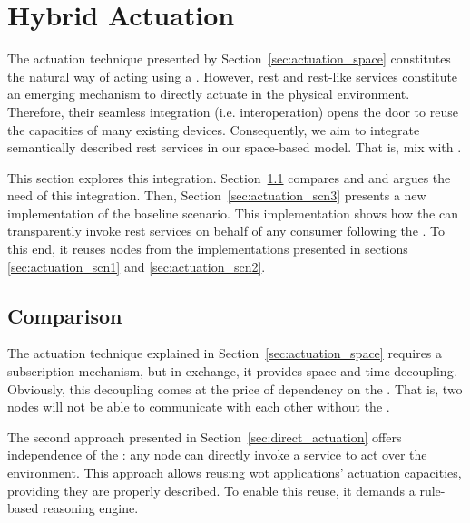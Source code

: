 \section{Hybrid Actuation}
\label{sec:hybrid_actuation}

The actuation technique presented by Section~\ref{sec:actuation_space} constitutes the natural way of acting using a \Space{}.
However, \ac{rest} and \ac{rest}-like services constitute an emerging mechanism to directly actuate in the physical environment.
Therefore, their seamless integration (i.e. interoperation) opens the door to reuse the capacities of many existing devices.
Consequently, we aim to integrate semantically described \ac{rest} services in our space-based model. %
That is, mix \spaceActuation{} with \restActuation{}.


This section explores this integration.
Section~\ref{sec:actuation_comparison} compares \spaceActuation{} and \restActuation{} and argues the need of this integration.
Then, Section~\ref{sec:actuation_scn3} presents a new implementation of the baseline scenario.
This implementation shows how the \Space{} can transparently invoke \ac{rest} services on behalf of any consumer following the \spaceActuation{}.
To this end, it reuses nodes from the implementations presented in sections \ref{sec:actuation_scn1} and \ref{sec:actuation_scn2}.


\subsection{Comparison}
\label{sec:actuation_comparison}

The actuation technique explained in Section~\ref{sec:actuation_space} requires a subscription mechanism, but in exchange, it provides space and time decoupling.
Obviously, this decoupling comes at the price of dependency on the \Space{}.
That is, two nodes will not be able to communicate with each other without the \Space{}.


The second approach presented in Section~\ref{sec:direct_actuation} offers independence of the \Space{}: any node can directly invoke a service to act over the environment.
This approach allows reusing \ac{wot} applications' actuation capacities, providing they are properly described. %
To enable this reuse, it demands a rule-based reasoning engine. %


